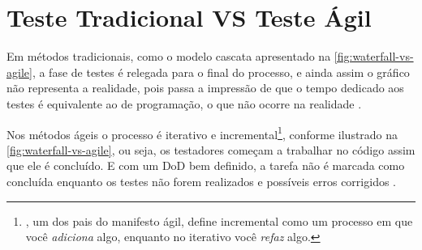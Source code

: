 \documentclass[
	12pt,				%
	openright,			%
	oneside,			%
	a4paper,			%
	english,			%
	brazil,				%
	]{abntex2}
\begin{document}
\section{Teste Tradicional VS Teste Ágil}

Em métodos tradicionais, como o modelo cascata apresentado na \autoref{fig:waterfall-vs-agile}, a fase de testes é relegada para o final do processo, e ainda assim o gráfico não representa a realidade, pois passa a impressão de que o tempo dedicado aos testes é equivalente ao de programação, o que não ocorre na realidade \cite{crispin2009}.

Nos métodos ágeis o processo é iterativo e incremental\footnote{, um dos pais do manifesto ágil, define incremental como um processo em que você \emph{adiciona} algo, enquanto no iterativo você \emph{refaz} algo.}, conforme ilustrado na \autoref{fig:waterfall-vs-agile}, ou seja, os testadores começam a trabalhar no código assim que ele é concluído. E com um DoD bem definido, a tarefa não é marcada como concluída enquanto os testes não forem realizados e possíveis erros corrigidos \cite{crispin2009}.


\end{document}
